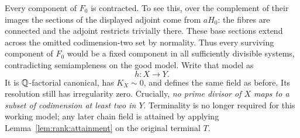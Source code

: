 Every component of $F_0$ is contracted.  To see this, over the complement
of their images the sections of the displayed adjoint come from $aH_0$:
the fibres are connected and the adjoint restricts trivially there.
These base sections extend across the omitted codimension-two set by
normality.  Thus every surviving component of $F_0$ would be a fixed
component in all sufficiently divisible systems, contradicting
semiampleness on the good model.  Write that model as
\begin{equation}\label{eq:rank:working-fibration}
                              h:X\longrightarrow Y.
\end{equation}
It is $\mathbb Q$-factorial canonical, has $K_X\sim0$, and defines the same
field as before.  Its resolution still has irregularity zero.  Crucially,
\emph{no prime divisor of $X$ maps to a subset of codimension at least
two in $Y$}.  Terminality is no longer required for this working model;
any later chain field is attained by applying
Lemma~\ref{lem:rank:attainment} on the original terminal $T$.



